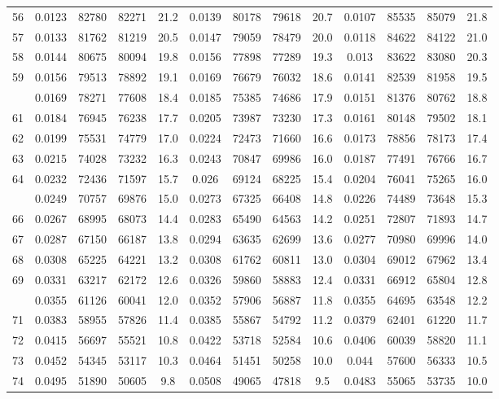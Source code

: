 \documentclass[
  14pt,
]{article}
\begin{document}
\begin{longtable}[t]{lcccccccccccc}
56 & 0.0123 & 82780 & 82271 & 21.2 & 0.0139 & 80178 & 79618 & 20.7 & 0.0107 & 85535 & 85079 & 21.8\\
57 & 0.0133 & 81762 & 81219 & 20.5 & 0.0147 & 79059 & 78479 & 20.0 & 0.0118 & 84622 & 84122 & 21.0\\
58 & 0.0144 & 80675 & 80094 & 19.8 & 0.0156 & 77898 & 77289 & 19.3 & 0.013 & 83622 & 83080 & 20.3\\
59 & 0.0156 & 79513 & 78892 & 19.1 & 0.0169 & 76679 & 76032 & 18.6 & 0.0141 & 82539 & 81958 & 19.5\\
\addlinespace
60 & 0.0169 & 78271 & 77608 & 18.4 & 0.0185 & 75385 & 74686 & 17.9 & 0.0151 & 81376 & 80762 & 18.8\\
61 & 0.0184 & 76945 & 76238 & 17.7 & 0.0205 & 73987 & 73230 & 17.3 & 0.0161 & 80148 & 79502 & 18.1\\
62 & 0.0199 & 75531 & 74779 & 17.0 & 0.0224 & 72473 & 71660 & 16.6 & 0.0173 & 78856 & 78173 & 17.4\\
63 & 0.0215 & 74028 & 73232 & 16.3 & 0.0243 & 70847 & 69986 & 16.0 & 0.0187 & 77491 & 76766 & 16.7\\
64 & 0.0232 & 72436 & 71597 & 15.7 & 0.026 & 69124 & 68225 & 15.4 & 0.0204 & 76041 & 75265 & 16.0\\
\addlinespace
65 & 0.0249 & 70757 & 69876 & 15.0 & 0.0273 & 67325 & 66408 & 14.8 & 0.0226 & 74489 & 73648 & 15.3\\
66 & 0.0267 & 68995 & 68073 & 14.4 & 0.0283 & 65490 & 64563 & 14.2 & 0.0251 & 72807 & 71893 & 14.7\\
67 & 0.0287 & 67150 & 66187 & 13.8 & 0.0294 & 63635 & 62699 & 13.6 & 0.0277 & 70980 & 69996 & 14.0\\
68 & 0.0308 & 65225 & 64221 & 13.2 & 0.0308 & 61762 & 60811 & 13.0 & 0.0304 & 69012 & 67962 & 13.4\\
69 & 0.0331 & 63217 & 62172 & 12.6 & 0.0326 & 59860 & 58883 & 12.4 & 0.0331 & 66912 & 65804 & 12.8\\
\addlinespace
70 & 0.0355 & 61126 & 60041 & 12.0 & 0.0352 & 57906 & 56887 & 11.8 & 0.0355 & 64695 & 63548 & 12.2\\
71 & 0.0383 & 58955 & 57826 & 11.4 & 0.0385 & 55867 & 54792 & 11.2 & 0.0379 & 62401 & 61220 & 11.7\\
72 & 0.0415 & 56697 & 55521 & 10.8 & 0.0422 & 53718 & 52584 & 10.6 & 0.0406 & 60039 & 58820 & 11.1\\
73 & 0.0452 & 54345 & 53117 & 10.3 & 0.0464 & 51451 & 50258 & 10.0 & 0.044 & 57600 & 56333 & 10.5\\
74 & 0.0495 & 51890 & 50605 & 9.8 & 0.0508 & 49065 & 47818 & 9.5 & 0.0483 & 55065 & 53735 & 10.0\\

\end{longtable}
\end{document}
